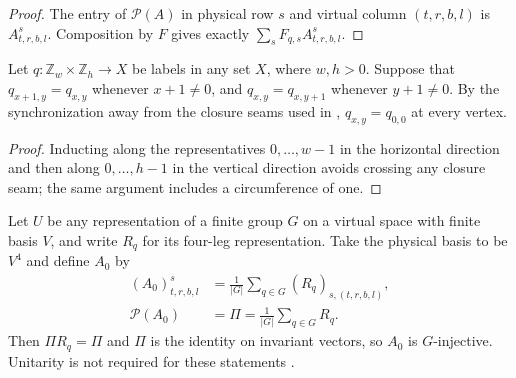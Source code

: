 \begin{proof}\leanok
    The entry of $\mathcal P(A)$ in physical row $s$ and virtual column
    $(t,r,b,l)$ is $A^s_{t,r,b,l}$. Composition by $F$ gives exactly
    $\sum_sF_{q,s}A^s_{t,r,b,l}$.
\end{proof}

\begin{lemma}%
    \label{thm:peps_torus_nonseam_connectivity}
    \leanok
    Let $q:\mathbb Z_w\times\mathbb Z_h\to X$ be labels in any set $X$, where $w,h>0$.
    Suppose that $q_{x+1,y}=q_{x,y}$ whenever $x+1\ne0$, and
    $q_{x,y}=q_{x,y+1}$ whenever $y+1\ne0$. By the synchronization away from the closure seams used in
    \cite[Theorem~5.9]{Schuch2010PEPS}, $q_{x,y}=q_{0,0}$ at every vertex.
\end{lemma}
\begin{proof}\leanok
    Inducting along the representatives $0,\ldots,w-1$ in the horizontal direction
    and then along $0,\ldots,h-1$ in the vertical direction avoids crossing
    any closure seam; the same argument includes a circumference of one.
\end{proof}

\begin{definition}%
    \label{def:peps_regular_averaging_site}
    \leanok
    Let $U$ be any representation of a finite group $G$ on a virtual
    space with finite basis $V$, and write $R_q$ for its four-leg
    representation. Take the physical basis to be $V^4$ and define $A_0$ by
    \begin{align}
        (A_0)^s_{t,r,b,l}
                        & =\frac1{|G|}\sum_{q\in G}(R_q)_{s,(t,r,b,l)}, \\
        \mathcal P(A_0) & =\Pi=\frac1{|G|}\sum_{q\in G}R_q.
        \label{eq:peps_averaging_site}
    \end{align}
    Then $\Pi R_q=\Pi$ and $\Pi$ is the identity on invariant vectors,
    so $A_0$ is $G$-injective. Unitarity is not required for these
    statements \cite[Definition~5.1]{Schuch2010PEPS}.
\end{definition}

